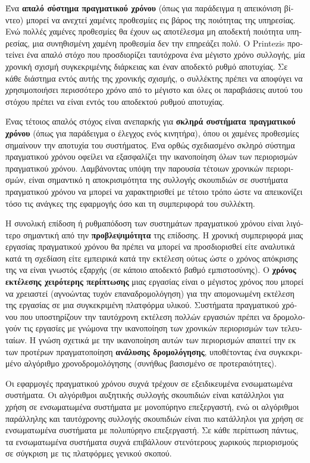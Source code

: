 \begin{greek}
Ένα \textbf{απαλό σύστημα πραγματικού χρόνου} (όπως για παράδειγμα
η απεικόνιση βίντεο) μπορεί να ανεχτεί χαμένες προθεσμίες εις
βάρος της ποιότητας της υπηρεσίας. Ενώ πολλές χαμένες προθεσμίες
θα έχουν ως αποτέλεσμα μη αποδεκτή ποιότητα υπηρεσίας, μια
συνηθισμένη χαμένη προθεσμία δεν την επηρεάζει πολύ. Ο Printezis
\cite{DBLP:journals/scp/Printezis06} προτείνει ένα απαλό στόχο
που προσδιορίζει ταυτόχρονα ένα μέγιστο χρόνο συλλογής, μία χρονική
σχισμή συγκεκριμένης διάρκειας και έναν αποδεκτό ρυθμό αποτυχίας.
Σε κάθε διάστημα εντός αυτής της χρονικής σχισμής, ο συλλέκτης
πρέπει να αποφύγει να χρησιμοποιήσει περισσότερο χρόνο από το
μέγιστο και όλες οι παραβιάσεις αυτού του στόχου πρέπει να είναι
εντός του αποδεκτού ρυθμού αποτυχίας. 

Ένας τέτοιος απαλός στόχος είναι ανεπαρκής για \textbf{σκληρά
συστήματα πραγματικού χρόνου} (όπως για παράδειγμα ο έλεγχος
ενός κινητήρα), όπου οι χαμένες προθεσμίες σημαίνουν την αποτυχία
του συστήματος. Ένα ορθώς σχεδιασμένο σκληρό σύστημα πραγματικού
χρόνου οφείλει να εξασφαλίζει την ικανοποίηση όλων των περιορισμών
πραγματικού χρόνου. Λαμβάνοντας υπόψη την παρουσία τέτοιων χρονικών
περιορισμών, είναι σημαντικό η αποκρισιμότητα της συλλογής
σκουπιδιών σε συστήματα πραγματικού χρόνου να μπορεί να χαρακτηρισθεί
με τέτοιο τρόπο ώστε να απεικονίζει τόσο τις ανάγκες της εφαρμογής
όσο και τη συμπεριφορά του συλλέκτη.

Η συνολική επίδοση ή ρυθμαπόδοση των συστημάτων πραγματικού χρόνου
είναι λιγότερο σημαντική από την \textbf{προβλεψιμότητα} της
επίδοσης. Η χρονική συμπεριφορά μιας εργασίας πραγματικού χρόνου
θα πρέπει να μπορεί να προσδιορισθεί είτε αναλυτικά κατά τη
σχεδίαση είτε εμπειρικά κατά την εκτέλεση ούτως ώστε ο χρόνος
απόκρισης της να είναι γνωστός εξαρχής (σε κάποιο αποδεκτό
βαθμό εμπιστοσύνης). Ο \textbf{χρόνος εκτέλεσης χειρότερης περίπτωσης}
μιας εργασίας είναι ο μέγιστος χρόνος που μπορεί να χρειαστεί
(αγνοώντας τυχόν επαναδρομολόγηση) για την απομονωμένη εκτέλεση
της εργασίας σε μια συγκεκριμένη πλατφόρμα υλικού. Συστήματα πραγματικού
χρόνου που υποστηρίζουν την ταυτόχρονη εκτέλεση πολλών εργασιών
πρέπει να δρομολογούν τις εργασίες με γνώμονα την ικανοποίηση
των χρονικών περιορισμών των τελευταίων. Η γνώση σχετικά με
την ικανοποίηση αυτών των περιορισμών απαιτεί την εκ των
προτέρων πραγματοποίηση \textbf{ανάλυσης δρομολόγησης}, υποθέτοντας
ένα συγκεκριμένο αλγόριθμο χρονοδρομολόγησης (συνήθως βασισμένο
σε προτεραιότητες).

Οι εφαρμογές πραγματικού χρόνου συχνά τρέχουν σε εξειδικευμένα
ενσωματωμένα συστήματα. Οι αλγόριθμοι αυξητικής συλλογής
σκουπιδιών είναι κατάλληλοι για χρήση σε ενσωματωμένα συστήματα
με μονοπύρηνο επεξεργαστή, ενώ οι αλγόριθμοι παράλληλης και
ταυτόχρονης συλλογής σκουπιδιών είναι πιο κατάλληλοι για χρήση
σε ενσωματωμένα συστήματα με πολυπύρηνο επεξεργαστή. Σε κάθε
περίπτωση πάντως, τα ενσωματωμένα συστήματα συχνά επιβάλλουν
στενότερους χωρικούς περιορισμούς σε σύγκριση με τις πλατφόρμες
γενικού σκοπού.


\end{greek}
